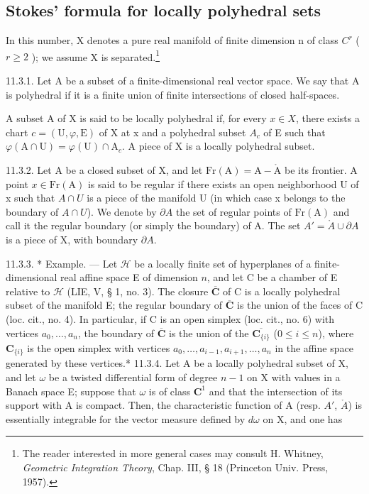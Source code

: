 \subsection{Stokes' formula for locally polyhedral sets}

In this number, X denotes a pure real manifold of finite dimension n of class \(C^{r}\) ( \(r \geqslant 2\) ); we assume X is separated.\footnote{The reader interested in more general cases may consult H. Whitney, \emph{Geometric Integration Theory}, Chap. III, § 18 (Princeton Univ. Press, 1957).}

11.3.1. Let A be a subset of a finite-dimensional real vector space. We say that A is polyhedral if it is a finite union of finite intersections of closed half-spaces.

A subset A of X is said to be locally polyhedral if, for every \(x \in X\), there exists a chart \(c = (\mathrm{U}, \varphi, \mathrm{E})\) of X at x and a polyhedral subset \(A_{c}\) of E such that \(\varphi(\mathrm{A} \cap \mathrm{U}) = \varphi(\mathrm{U}) \cap \mathrm{A}_{c}\). A piece of X is a locally polyhedral subset.

11.3.2. Let A be a closed subset of X, and let \(\mathrm{Fr}(\mathrm{A}) = \mathrm{A} - \mathring{\mathrm{A}}\) be its frontier. A point \(x \in \mathrm{Fr}(\mathrm{A})\) is said to be regular if there exists an open neighborhood U of x such that \(A \cap U\) is a piece of the manifold U (in which case x belongs to the boundary of \(A \cap U\)). We denote by \(\partial A\) the set of regular points of \(\mathrm{Fr}(\mathrm{A})\) and call it the regular boundary (or simply the boundary) of A. The set \(A' = \mathring{A} \cup \partial A\) is a piece of X, with boundary \(\partial A\).

11.3.3. * Example. --- Let \(\mathcal{H}\) be a locally finite set of hyperplanes of a finite-dimensional real affine space E of dimension \(n\), and let C be a chamber of E relative to \(\mathcal{H}\) (LIE, V, § 1, no. 3). The closure \(\overline{\mathbf{C}}\) of C is a locally polyhedral subset of the manifold E; the regular boundary of \(\overline{\mathbf{C}}\) is the union of the faces of C (loc. cit., no. 4). In particular, if C is an open simplex (loc. cit., no. 6) with vertices \(a_0, \ldots, a_n\), the boundary of \(\overline{\mathbf{C}}\) is the union of the \(\overline{\mathbf{C}_{\{i\}}}\) (\(0 \leqslant i \leqslant n\)), where \(\mathbf{C}_{\{i\}}\) is the open simplex with vertices \(a_0, \ldots, a_{i-1}, a_{i+1}, \ldots, a_n\) in the affine space generated by these vertices.* 
11.3.4. Let A be a locally polyhedral subset of X, and let \(\omega\) be a twisted differential form of degree \(n - 1\) on X with values in a Banach space E; suppose that \(\omega\) is of class \(\mathbf{C}^1\) and that the intersection of its support with A is compact. Then, the characteristic function of A (resp. \(A'\), \(\mathring{A}\)) is essentially integrable for the vector measure defined by \(d\omega\) on X, and one has

